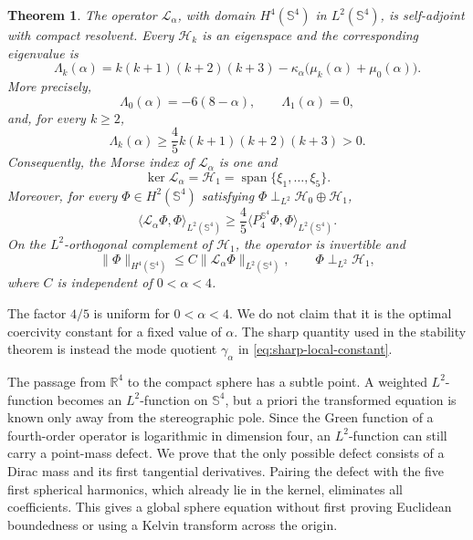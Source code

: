 \documentclass[11pt]{article}
\newtheorem{theorem}{Theorem}[section]
\numberwithin{equation}{section}
\begin{document}
\begin{theorem}\label{thm:full-spectrum}
The operator \(\mathcal L_{\alpha}\), with domain \(H^{4}(\mathbb S^{4})\) in \(L^{2}(\mathbb S^{4})\), is self-adjoint with compact resolvent. Every \(\mathcal H_{k}\) is an eigenspace and the corresponding eigenvalue is
\begin{equation}\label{eq:Lambda-k-intro}
\Lambda_{k}(\alpha)
=k(k+1)(k+2)(k+3)
-\kappa_{\alpha}
\bigl(\mu_{k}(\alpha)+\mu_{0}(\alpha)\bigr).
\end{equation}
More precisely,
\begin{equation*}
\Lambda_{0}(\alpha)=-6(8-\alpha),
\qquad
\Lambda_{1}(\alpha)=0,
\end{equation*}
and, for every \(k\geq2\),
\begin{equation*}
\Lambda_{k}(\alpha)
\geq\frac45 k(k+1)(k+2)(k+3)>0.
\end{equation*}
Consequently, the Morse index of \(\mathcal L_{\alpha}\) is one and
\[
\ker\mathcal L_{\alpha}=\mathcal H_{1}
=\operatorname{span}\{\xi_{1},\ldots,\xi_{5}\}.
\]
Moreover, for every \(\Phi\in H^{2}(\mathbb S^{4})\) satisfying
\(\Phi\perp_{L^{2}}\mathcal H_{0}\oplus\mathcal H_{1}\),
\begin{equation}\label{eq:coercivity-intro}
\langle\mathcal L_{\alpha}\Phi,\Phi\rangle_{L^{2}(\mathbb S^{4})}
\geq
\frac45
\langle P_{4}^{\mathbb S^{4}}\Phi,\Phi\rangle_{L^{2}(\mathbb S^{4})}.
\end{equation}
On the \(L^{2}\)-orthogonal complement of \(\mathcal H_{1}\), the operator is invertible and
\begin{equation*}
\|\Phi\|_{H^{4}(\mathbb S^{4})}
\leq C\|\mathcal L_{\alpha}\Phi\|_{L^{2}(\mathbb S^{4})},
\qquad \Phi\perp_{L^{2}}\mathcal H_{1},
\end{equation*}
where \(C\) is independent of \(0<\alpha<4\).
\end{theorem}

The factor \(4/5\) is uniform for \(0<\alpha<4\). We do not claim that it is
the optimal coercivity constant for a fixed value of \(\alpha\). The sharp
quantity used in the stability theorem is instead the mode quotient
\(\gamma_{\alpha}\) in \eqref{eq:sharp-local-constant}.

The passage from \(\mathbb R^{4}\) to the compact sphere has a subtle point. A weighted \(L^{2}\)-function becomes an \(L^{2}\)-function on \(\mathbb S^{4}\), but a priori the transformed equation is known only away from the stereographic pole. Since the Green function of a fourth-order operator is logarithmic in dimension four, an \(L^{2}\)-function can still carry a point-mass defect. We prove that the only possible defect consists of a Dirac mass and its first tangential derivatives. Pairing the defect with the five first spherical harmonics, which already lie in the kernel, eliminates all coefficients. This gives a global sphere equation without first proving Euclidean boundedness or using a Kelvin transform across the origin.
\end{document}
